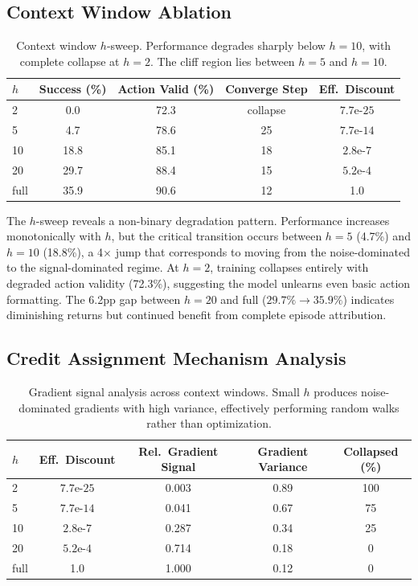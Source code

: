 \documentclass{article}
\begin{document}
\subsection{Context Window Ablation}

\begin{table}[h]
\centering
\caption{Context window $h$-sweep. Performance degrades sharply below $h=10$, with complete collapse at $h=2$. The cliff region lies between $h=5$ and $h=10$.}
\begin{tabular}{lcccc}
\toprule
$h$ & Success (\%) & Action Valid (\%) & Converge Step & Eff.\ Discount \\
\midrule
2 & 0.0 & 72.3 & collapse & $7.7\text{e-}25$ \\
5 & 4.7 & 78.6 & 25 & $7.7\text{e-}14$ \\
10 & 18.8 & 85.1 & 18 & $2.8\text{e-}7$ \\
20 & 29.7 & 88.4 & 15 & $5.2\text{e-}4$ \\
full & 35.9 & 90.6 & 12 & 1.0 \\
\bottomrule
\end{tabular}
\label{tab:hsweep}
\end{table}

The $h$-sweep reveals a non-binary degradation pattern. Performance increases monotonically with $h$, but the critical transition occurs between $h=5$ (4.7\%) and $h=10$ (18.8\%), a 4$\times$ jump that corresponds to moving from the noise-dominated to the signal-dominated regime. At $h=2$, training collapses entirely with degraded action validity (72.3\%), suggesting the model unlearns even basic action formatting. The 6.2pp gap between $h=20$ and full ($29.7\% \to 35.9\%$) indicates diminishing returns but continued benefit from complete episode attribution.

\subsection{Credit Assignment Mechanism Analysis}

\begin{table}[h]
\centering
\caption{Gradient signal analysis across context windows. Small $h$ produces noise-dominated gradients with high variance, effectively performing random walks rather than optimization.}
\begin{tabular}{lcccc}
\toprule
$h$ & Eff.\ Discount & Rel.\ Gradient Signal & Gradient Variance & Collapsed (\%) \\
\midrule
2 & $7.7\text{e-}25$ & 0.003 & 0.89 & 100 \\
5 & $7.7\text{e-}14$ & 0.041 & 0.67 & 75 \\
10 & $2.8\text{e-}7$ & 0.287 & 0.34 & 25 \\
20 & $5.2\text{e-}4$ & 0.714 & 0.18 & 0 \\
full & 1.0 & 1.000 & 0.12 & 0 \\
\bottomrule
\end{tabular}
\label{tab:gradient}
\end{table}
\end{document}
